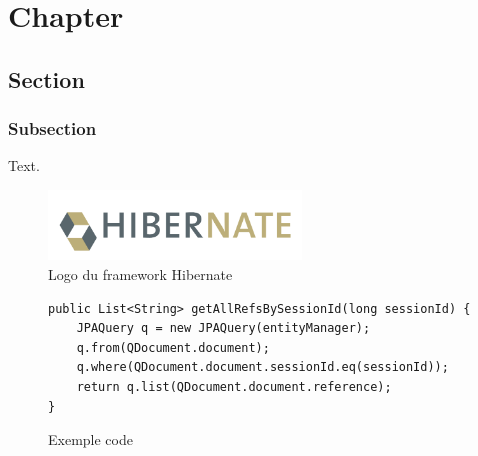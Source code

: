 \chapter*{Chapter}

\section{Section}

\subsection{Subsection}

Text. \\

\begin{figure}[h]
    \begin{center}
        \includegraphics[width=0.6\textwidth]{images/30-hibernate.png} 
    \end{center}
    \caption{Logo du framework Hibernate}
\end{figure}

\clearpage
\begin{figure}[h]
    \begin{center}
        \begin{verbatim}
public List<String> getAllRefsBySessionId(long sessionId) {
    JPAQuery q = new JPAQuery(entityManager);
    q.from(QDocument.document);
    q.where(QDocument.document.sessionId.eq(sessionId));
    return q.list(QDocument.document.reference);
}
        \end{verbatim}
        \caption{Exemple code}
    \end{center}
\end{figure}
